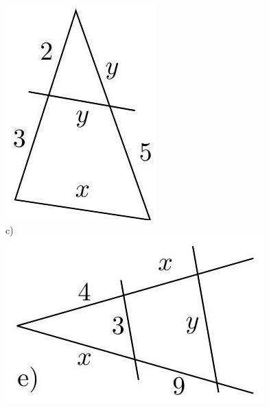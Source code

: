 \documentclass[10pt]{article}
\begin{document}
\includegraphics[max width=\textwidth, center]{2024_11_21_e9b4faa005d5be2cc318g-008(2)}\\
c)\\
\includegraphics[max width=\textwidth, center]{2024_11_21_e9b4faa005d5be2cc318g-008(4)}\\
\end{document}
